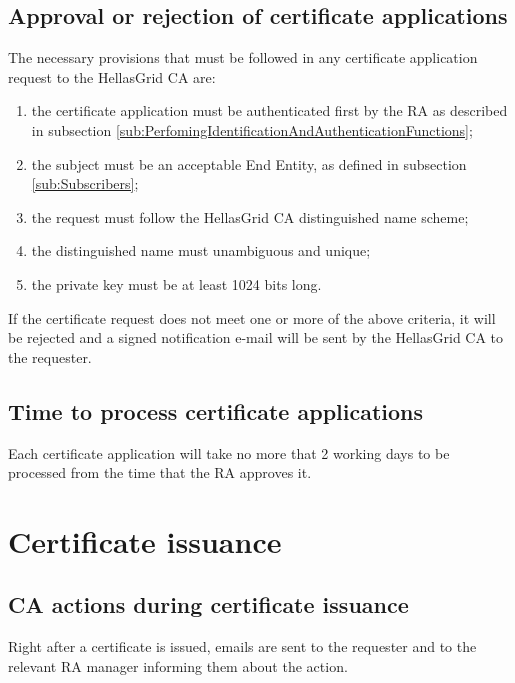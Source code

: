 \subsection{Approval or rejection of certificate applications}
\label{sub:ApprovalOrRejectionOfCertificateApplications}

The necessary provisions that must be followed in any certificate application request to the HellasGrid CA are:

\begin{enumerate}
\item{the certificate application must be authenticated first by the RA as described in subsection \ref{sub:PerfomingIdentificationAndAuthenticationFunctions};}
\item{the subject must be an acceptable End Entity, as defined in subsection \ref{sub:Subscribers};}
\item{the request must follow the HellasGrid CA distinguished name scheme;}
\item{the distinguished name must unambiguous and unique;}
\item{the private key must be at least 1024 bits long.}
\end{enumerate}

If the certificate request does not meet one or more of the above criteria, it will be rejected and a signed notification e-mail will be sent by the HellasGrid CA to the requester.

\subsection{Time to process certificate applications}

Each certificate application will take no more that 2 working days to be processed from the time that the RA approves it.

\section{Certificate issuance}
\subsection{CA actions during certificate issuance}


Right after a certificate is issued, emails are sent to the requester and to the relevant RA manager informing them about the action.


